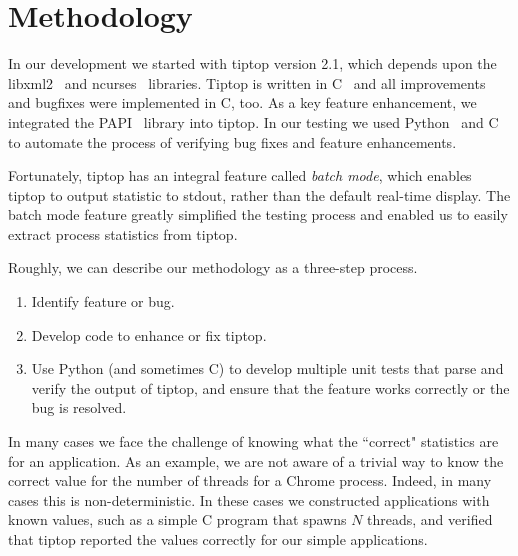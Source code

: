\section{Methodology}
\label{sec:methodology}
In our development we started with tiptop version 2.1, which depends upon the libxml2~\cite{xxx} and ncurses~\cite{xxx} libraries.
Tiptop is written in C~\cite{xxx} and all improvements and bugfixes were implemented in C, too.
As a key feature enhancement, we integrated the PAPI~\cite{xxx} library into tiptop.
In our testing we used Python~\cite{xxx} and C to automate the process of verifying bug fixes and feature enhancements.

Fortunately, tiptop has an integral feature called \emph{batch mode}, which enables tiptop to output statistic to stdout, rather than the default real-time display.
The batch mode feature greatly simplified the testing process and enabled us to easily extract process statistics from tiptop.

Roughly, we can describe our methodology as a three-step process.
\begin{enumerate}
\item Identify feature or bug.
\item Develop code to enhance or fix tiptop.
\item Use Python (and sometimes C) to develop multiple unit tests that parse and verify the output of tiptop, and ensure that the feature works correctly or the bug is resolved.
\end{enumerate}

In many cases we face the challenge of knowing what the ``correct" statistics are for an application. As an example, we are not aware of a trivial way to know the correct value for the number of threads for a Chrome process. Indeed, in many cases this is non-deterministic.
In these cases we constructed applications with known values, such as a simple C program that spawns $N$ threads, and verified that tiptop reported the values correctly for our simple applications.